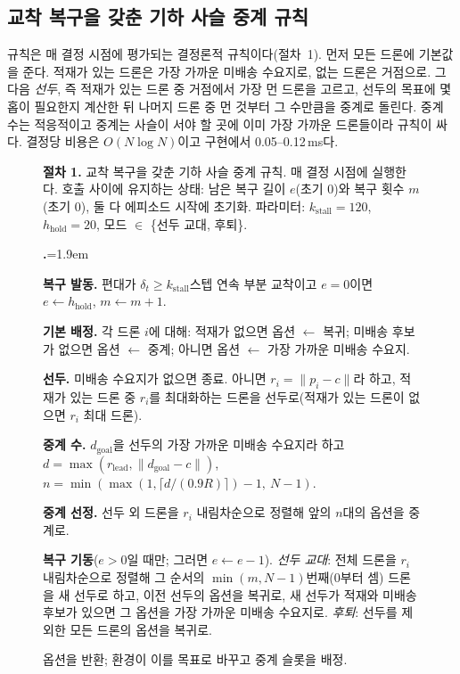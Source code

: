 \documentclass[final,5p,times,twocolumn]{elsarticle}
\newcounter{procstep}
\newenvironment{procsteps}{\setcounter{procstep}{0}\begin{list}{\stepcounter{procstep}\textbf{\theprocstep.}}{\leftmargin=1.9em\itemsep=1.5pt\parsep=0pt\topsep=3pt}}{\end{list}}
\begin{document}
\subsection{교착 복구을 갖춘 기하 사슬 중계 규칙}
\label{sec:heuristic}

규칙은 매 결정 시점에 평가되는 결정론적 규칙이다(절차~1). 먼저 모든 드론에 기본값을 준다.
적재가 있는 드론은 가장 가까운 미배송 수요지로, 없는 드론은 거점으로. 그 다음 \emph{선두}, 즉 적재가
있는 드론 중 거점에서 가장 먼 드론을 고르고, 선두의 목표에 몇 홉이 필요한지 계산한 뒤 나머지 드론
중 먼 것부터 그 수만큼을 중계로 돌린다. 중계 수는 적응적이고 중계는 사슬이 서야 할 곳에 이미
가장 가까운 드론들이라 규칙이 싸다. 결정당 비용은 $O(N \log N)$이고 구현에서
0.05--0.12\,ms다.

\begin{figure}[t]
\footnotesize
\noindent\textbf{절차 1.} 교착 복구을 갖춘 기하 사슬 중계 규칙. 매 결정 시점에 실행한다.
호출 사이에 유지하는 상태: 남은 복구 길이 $e$(초기 0)와 복구 횟수 $m$(초기 0), 둘 다 에피소드
시작에 초기화. 파라미터: $k_{\mathrm{stall}} = 120$, $h_{\mathrm{hold}} = 20$, 모드 $\in$
\{선두 교대, 후퇴\}.
\begin{procsteps}
\item \textbf{복구 발동.} 편대가 $\delta_t \ge k_{\mathrm{stall}}$스텝 연속 부분 교착이고 $e = 0$이면
$e \leftarrow h_{\mathrm{hold}}$, $m \leftarrow m + 1$.
\item \textbf{기본 배정.} 각 드론 $i$에 대해: 적재가 없으면 옵션 $\leftarrow$ 복귀; 미배송 후보가
없으면 옵션 $\leftarrow$ 중계; 아니면 옵션 $\leftarrow$ 가장 가까운 미배송 수요지.
\item \textbf{선두.} 미배송 수요지가 없으면 종료. 아니면 $r_i = \|p_i - c\|$라 하고, 적재가 있는
드론 중 $r_i$를 최대화하는 드론을 선두로(적재가 있는 드론이 없으면 $r_i$ 최대 드론).
\item \textbf{중계 수.} $d_{\mathrm{goal}}$을 선두의 가장 가까운 미배송 수요지라 하고
$d = \max(r_{\mathrm{lead}}, \|d_{\mathrm{goal}} - c\|)$,
$n = \min(\max(1, \lceil d / (0.9R) \rceil) - 1,\ N - 1)$.
\item \textbf{중계 선정.} 선두 외 드론을 $r_i$ 내림차순으로 정렬해 앞의 $n$대의 옵션을 중계로.
\item \textbf{복구 기동}($e > 0$일 때만; 그러면 $e \leftarrow e - 1$). \emph{선두 교대}: 전체
드론을 $r_i$ 내림차순으로 정렬해 그 순서의 $\min(m, N-1)$번째(0부터 셈) 드론을 새 선두로 하고,
이전 선두의 옵션을 복귀로, 새 선두가 적재와 미배송 후보가 있으면 그 옵션을 가장 가까운 미배송
수요지로. \emph{후퇴}: 선두를 제외한 모든 드론의 옵션을 복귀로.
\item 옵션을 반환; 환경이 이를 목표로 바꾸고 중계 슬롯을 배정.
\end{procsteps}
\end{figure}
\end{document}
